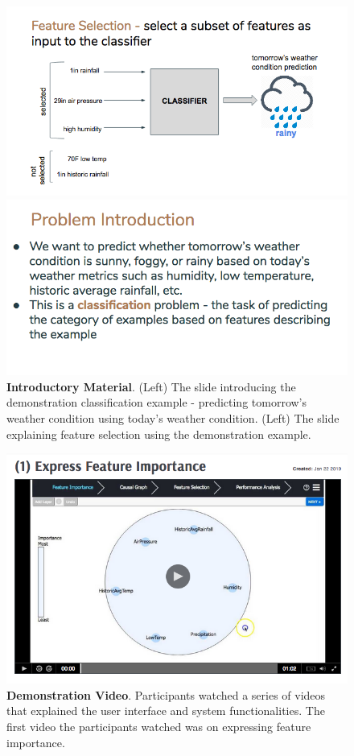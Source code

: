 \begin{figure}
    \centering
    \begin{minipage}{0.5\textwidth}
        \centering
        \includegraphics[width=.85\textwidth]{intromaterial1}
    \end{minipage}\hfill
    \begin{minipage}{0.5\textwidth}
        \centering
        \includegraphics[width=1\textwidth]{intromaterial2}
    \end{minipage}
    \caption{\textbf{Introductory Material}. (Left) The slide introducing the demonstration classification example - predicting tomorrow's weather condition using today's weather condition. (Left) The slide explaining feature selection using the demonstration example. }
    \label{fig:IntroMaterials1}
\end{figure}

\begin{figure}
    \centering
    \includegraphics[width=.85\textwidth]{intromaterial3}
    \caption{\textbf{Demonstration Video}. Participants watched a series of videos that explained the user interface and system functionalities. The first video the participants watched was on expressing feature importance. }
    \label{fig:IntroMaterials2}
\end{figure}

